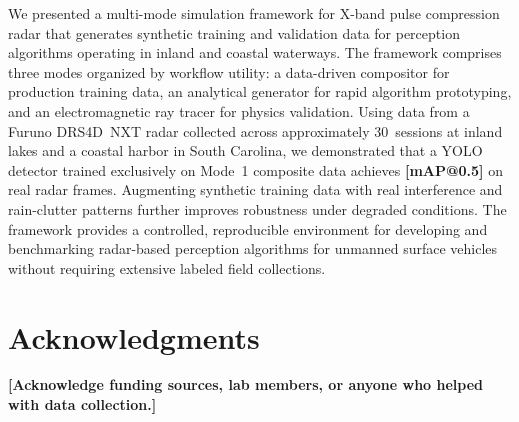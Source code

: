\documentclass[conf]{new-aiaa}
\newcommand{\ph}[1]{\textbf{[#1]}}
\begin{document}
We presented a multi-mode simulation framework for X-band pulse compression radar that generates synthetic training and validation data for perception algorithms operating in inland and coastal waterways. The framework comprises three modes organized by workflow utility: a data-driven compositor for production training data, an analytical generator for rapid algorithm prototyping, and an electromagnetic ray tracer for physics validation. Using data from a Furuno DRS4D~NXT radar collected across approximately 30~sessions at inland lakes and a coastal harbor in South Carolina, we demonstrated that a YOLO detector trained exclusively on Mode~1 composite data achieves \ph{mAP@0.5} on real radar frames. Augmenting synthetic training data with real interference and rain-clutter patterns further improves robustness under degraded conditions. The framework provides a controlled, reproducible environment for developing and benchmarking radar-based perception algorithms for unmanned surface vehicles without requiring extensive labeled field collections.

\section*{Acknowledgments}

\ph{Acknowledge funding sources, lab members, or anyone who helped with data collection.}




\end{document}

